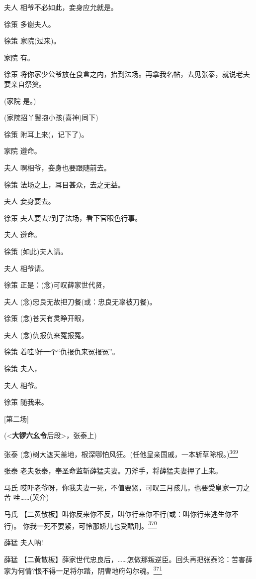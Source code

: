 夫人 相爷不必如此，妾身应允就是。

徐策 多谢夫人。

徐策 家院(过来)。

家院 有。

徐策 将你家少公爷放在食盒之内，抬到法场。再拿我名帖，去见张泰，就说老夫
要亲自祭奠。

(家院 是。)

(家院招丫鬟抱小孩(喜神)同下)

徐策 附耳上来(，记下了)。

家院 遵命。

夫人 啊相爷，妾身也要跟随前去。

徐策 法场之上，耳目甚众，去之无益。

夫人 妾身要去。

徐策 夫人要去?到了法场，看下官眼色行事。

夫人 遵命。

徐策 (如此)夫人请。

夫人 相爷请。

徐策 正是：(念)可叹薛家世代贤，

夫人 (念)忠良无故把刀餐(或：忠良无辜被刀餐)。

徐策 (念)苍天有灵睁开眼，

夫人 (念)仇报仇来冤报冤。

徐策 着哇!好一个``仇报仇来冤报冤''。

徐策 夫人，

夫人 相爷。

徐策 随我来。

{[}第二场{]}

(\textless{}\textbf{大锣六幺令}后段\textgreater{}，张泰上)

张泰
(念)树大遮天盖地，根深哪怕风狂。(任他皇亲国戚，一本斩草除根。)\protect\hyperlink{fn369}{\textsuperscript{369}}

张泰 老夫张泰，奉圣命监斩薛猛夫妻。刀斧手，将薛猛夫妻押了上来。

马氏
哎吓老爷呀，你我夫妻一死，不值要紧，可叹三月孩儿，也要受皇家一刀之苦
哇\ldots{}\ldots{}(哭介)

马氏
【二黄散板】叫你反来你不反，叫你行来你不行(或：叫你行来逃生你不行)。
你我一死不要紧，可怜那娇儿也受酷刑。\protect\hyperlink{fn370}{\textsuperscript{370}}

薛猛 夫人呐!

薛猛
【二黄散板】薛家世代忠良后，\ldots{}\ldots{}怎做那叛逆臣。回头再把张泰论：苦害薛
家为何情?恨不得一足将尔踏，阴曹地府勾尔魂。\protect\hyperlink{fn371}{\textsuperscript{371}}

